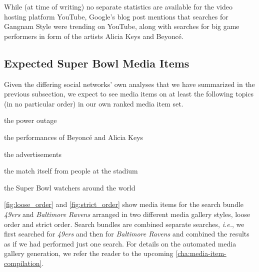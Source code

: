 While (at time of writing) no separate statistics are available
for the video hosting platform YouTube,
Google's blog post mentions that searches for Gangnam Style were trending on YouTube,
along with searches for big game performers
in form of the artists Alicia Keys and Beyoncé.

\subsection{Expected Super Bowl Media Items}

Given the differing social networks' own analyses
that we have summarized in the previous subsection,
we expect to see media items
on at least the following topics (in no particular order)
in our own ranked media item set.

\begin{small_itemize}
  \small
  \item[] the power outage
  \item[] the performances of Beyoncé and Alicia Keys
  \item[] the advertisements
  \item[] the match itself from people at the stadium
  \item[] the Super Bowl watchers around the world
\end{small_itemize}

\autoref{fig:loose_order} and \autoref{fig:strict_order} show media items
for the search bundle \emph{49ers} and \emph{Baltimore Ravens} arranged
in two different media gallery styles, loose order and strict order.
Search bundles are combined separate searches, \emph{i.e.},
we first searched for \emph{49ers} and then for \emph{Baltimore Ravens}
and combined the results as if we had performed just one search.
For details on the automated media gallery generation, we refer the reader to the upcoming
\autoref{cha:media-item-compilation}.

